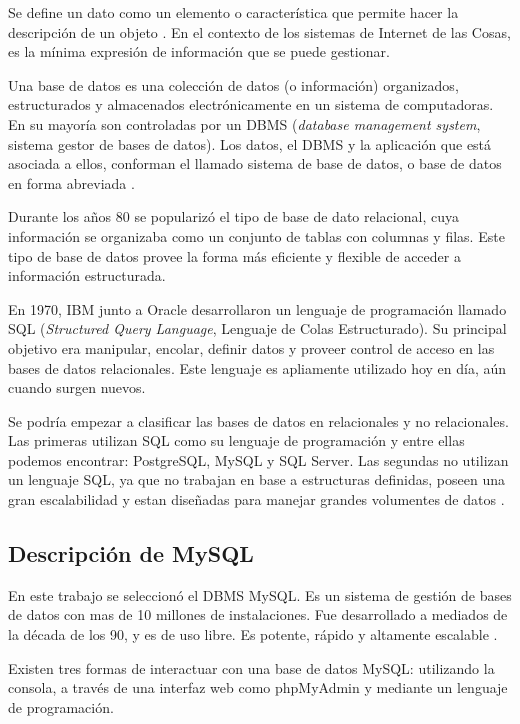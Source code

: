 Se define un dato como un elemento o característica que permite hacer la descripción de un objeto \citep{WEBSITE:12}. En el contexto de los sistemas de Internet de las Cosas, es la mínima expresión de información que se puede gestionar.

Una base de datos es una colección de datos (o información) organizados, estructurados y almacenados electrónicamente en un sistema de computadoras. En su mayoría son controladas por un DBMS (\textit{database management system}, sistema gestor de bases de datos). Los datos, el DBMS y la aplicación que está asociada a ellos, conforman el llamado sistema de base de datos, o base de datos en forma abreviada \citep{WEBSITE:11}.

Durante los años 80 se popularizó el tipo de base de dato relacional, cuya información se organizaba como un conjunto de tablas con columnas y filas. Este tipo de base de datos provee la forma más eficiente y flexible de acceder a información estructurada.

En 1970, IBM junto a Oracle desarrollaron un lenguaje de programación llamado SQL (\textit{Structured Query Language}, Lenguaje de Colas Estructurado). Su principal objetivo era manipular, encolar, definir datos y proveer control de acceso en las bases de datos relacionales. Este lenguaje es apliamente utilizado hoy en día, aún cuando surgen nuevos.

Se podría empezar a clasificar las bases de datos en relacionales y no relacionales. Las primeras utilizan SQL como su lenguaje de programación y entre ellas podemos encontrar: PostgreSQL, MySQL y SQL Server. Las segundas no utilizan un lenguaje SQL, ya que no trabajan en base a estructuras definidas, poseen una gran escalabilidad y estan diseñadas para manejar grandes volumentes de datos \citep{WEBSITE:12}.


\subsection{Descripción de MySQL}
\label{subsec: Bases de datos relacionales}

En este trabajo se seleccionó el DBMS MySQL. Es un sistema de gestión de bases de datos con mas de 10 millones de instalaciones. Fue desarrollado a mediados de la década de los 90, y es de uso libre. Es potente, rápido y altamente escalable \citep{BOOK:2}.

Existen tres formas de interactuar con una base de datos MySQL: utilizando la consola, a través de una interfaz web como phpMyAdmin y mediante un lenguaje de programación.

